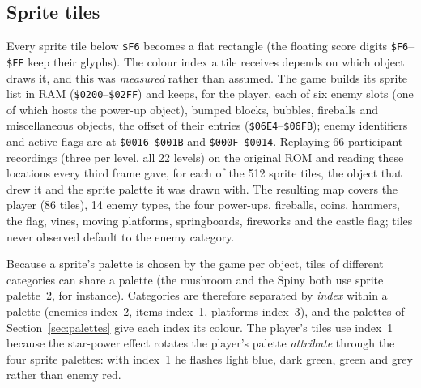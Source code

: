 \documentclass{article}
\newcommand{\hex}[1]{\texttt{\$#1}}
\begin{document}
\subsection{Sprite tiles}
\label{sec:sprites}

Every sprite tile below \hex{F6} becomes a flat rectangle (the floating score digits
\hex{F6}--\hex{FF} keep their glyphs). The colour index a tile receives depends on which object
draws it, and this was \emph{measured} rather than assumed. The game builds its sprite list in RAM
(\hex{0200}--\hex{02FF}) and keeps, for the player, each of six enemy slots (one of which hosts
the power-up object), bumped blocks, bubbles, fireballs and miscellaneous objects, the offset of
their entries (\hex{06E4}--\hex{06FB}); enemy identifiers and active flags are at
\hex{0016}--\hex{001B} and \hex{000F}--\hex{0014}. Replaying 66 participant recordings (three
per level, all 22 levels) on the original ROM and reading these locations every third frame gave,
for each of the 512 sprite tiles, the object that drew it and the sprite palette it was drawn
with. The resulting map covers the player (86 tiles), 14 enemy types, the four power-ups,
fireballs, coins, hammers, the flag, vines, moving platforms, springboards, fireworks and the
castle flag; tiles never observed default to the enemy category.

Because a sprite's palette is chosen by the game per object, tiles of different categories can
share a palette (the mushroom and the Spiny both use sprite palette~2, for instance). Categories
are therefore separated by \emph{index} within a palette (enemies index~2, items index~1,
platforms index~3), and the palettes of Section~\ref{sec:palettes} give each index its colour.
The player's tiles use index~1 because the star-power effect rotates the player's palette
\emph{attribute} through the four sprite palettes: with index~1 he flashes light blue, dark
green, green and grey rather than enemy red.
\end{document}
